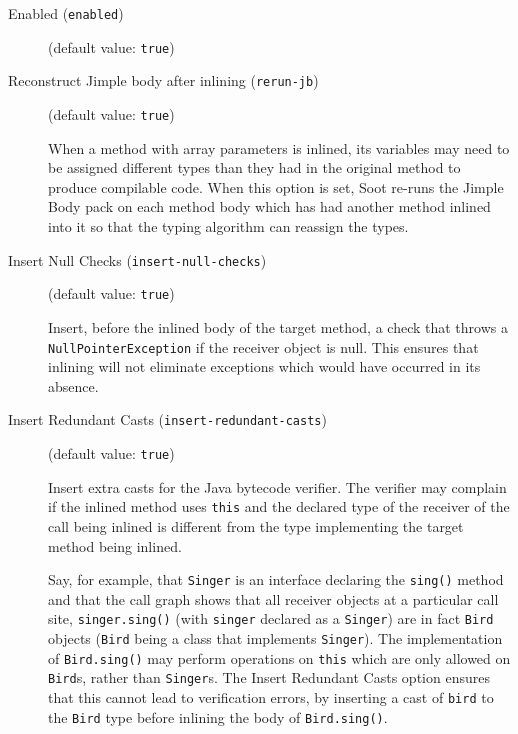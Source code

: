 \documentclass{article}
\begin{document}
\begin{description}

\item[Enabled ({\tt enabled})]
(default value: {\tt true})






\item[Reconstruct Jimple body after inlining ({\tt rerun-jb})]
(default value: {\tt true})




When a method with array parameters is inlined, its variables may need to
be assigned different types than they had in the original method to produce
compilable code. When this option is set, Soot re-runs the Jimple Body pack
on each method body which has had another method inlined into it so that
the typing algorithm can reassign the types.



\item[Insert Null Checks ({\tt insert-null-checks})]
(default value: {\tt true})




Insert, before the inlined body of the target method, a check
that throws a {\tt NullPointerException} if the receiver
object is null.  This ensures that inlining will not eliminate
exceptions which would have occurred in its absence.



\item[Insert Redundant Casts ({\tt insert-redundant-casts})]
(default value: {\tt true})





\par

Insert extra casts for the Java bytecode verifier.  The verifier
may complain if the inlined method uses {\tt this} and the
declared type of the receiver of the call being inlined is
different from the type implementing the target method being
inlined.

\par

Say, for example, that {\tt Singer} is an interface declaring
the {\tt sing()} method and that the call graph shows that all
receiver objects at a particular call site,
{\tt singer.sing()} (with {\tt singer} declared as a
{\tt Singer}) are in fact {\tt Bird} objects ({\tt Bird}
being a class that implements {\tt Singer}). The
implementation of {\tt Bird.sing()} may perform operations on
{\tt this} which are only allowed on {\tt Bird}s, rather
than {\tt Singer}s.  The Insert Redundant Casts option ensures that
this cannot lead to verification errors, by inserting a cast of
{\tt bird} to the {\tt Bird} type before inlining the body
of {\tt Bird.sing()}.




\end{description}
\end{document}
